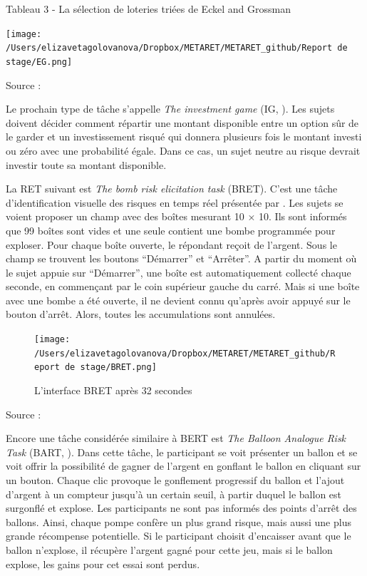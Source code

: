 \documentclass[12pt]{article}
\begin{document}
Tableau 3 - La sélection de loteries triées de Eckel and Grossman

\hfil \texttt{[image: /Users/elizavetagolovanova/Dropbox/METARET/METARET\_github/Report de stage/EG.png]}
\hfil

Source : \citet{Eckel2002}

Le prochain type de tâche s'appelle \emph{The investment game} (IG,
\citet{Gneezy1997}). Les sujets doivent décider comment répartir une
montant disponible entre un option sûr de le garder et un investissement
risqué qui donnera plusieurs fois le montant investi ou zéro avec une
probabilité égale. Dans ce cas, un sujet neutre au risque devrait
investir toute sa montant disponible.

La RET suivant est \emph{The bomb risk elicitation task} (BRET). C'est
une tâche d'identification visuelle des risques en temps réel présentée
par \citet{CroFil2013b}. Les sujets se voient proposer un champ avec des
boîtes mesurant 10 × 10. Ils sont informés que 99 boîtes sont vides et
une seule contient une bombe programmée pour exploser. Pour chaque boîte
ouverte, le répondant reçoit de l'argent. Sous le champ se trouvent les
boutons ``Démarrer'' et ``Arrêter''. A partir du moment où le sujet
appuie sur ``Démarrer'', une boîte est automatiquement collecté chaque
seconde, en commençant par le coin supérieur gauche du carré. Mais si
une boîte avec une bombe a été ouverte, il ne devient connu qu'après
avoir appuyé sur le bouton d'arrêt. Alors, toutes les accumulations sont
annulées.

\begin{figure}
\centering
\texttt{[image: /Users/elizavetagolovanova/Dropbox/METARET/METARET\_github/Report de stage/BRET.png]}
\caption{L'interface BRET après 32 secondes}
\end{figure}

Source : \citet{CroFil2013b}

Encore une tâche considérée similaire à BERT est \emph{The Balloon
Analogue Risk Task} (BART, \citet{Hunt2005}). Dans cette tâche, le
participant se voit présenter un ballon et se voit offrir la possibilité
de gagner de l'argent en gonflant le ballon en cliquant sur un bouton.
Chaque clic provoque le gonflement progressif du ballon et l'ajout
d'argent à un compteur jusqu'à un certain seuil, à partir duquel le
ballon est surgonflé et explose. Les participants ne sont pas informés
des points d'arrêt des ballons. Ainsi, chaque pompe confère un plus
grand risque, mais aussi une plus grande récompense potentielle. Si le
participant choisit d'encaisser avant que le ballon n'explose, il
récupère l'argent gagné pour cette jeu, mais si le ballon explose, les
gains pour cet essai sont perdus.
\end{document}
